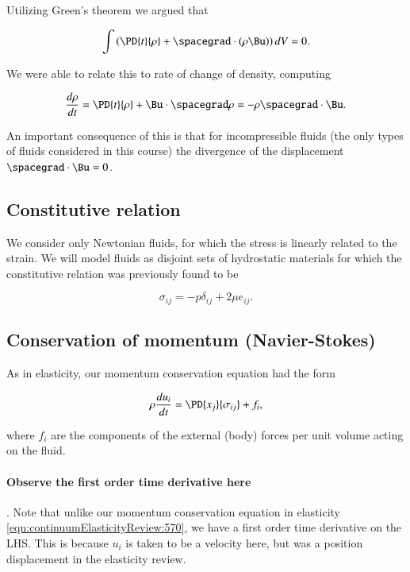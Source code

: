 Utilizing Green's theorem we argued that 

\begin{equation}\label{eqn:continuumFluidsReview:1030}
\int \left( \PD{t}{\rho} + \spacegrad \cdot (\rho \Bu) \right) dV = 0.
\end{equation}

We were able to relate this to rate of change of density, computing

\begin{equation}\label{eqn:continuumFluidsReview:1050}
\frac{d\rho}{dt} = \PD{t}{\rho} + \Bu \cdot \spacegrad \rho =
- \rho \spacegrad \cdot \Bu.
\end{equation}

An important consequence of this is that for incompressible fluids (the only types of fluids considered in this course) the divergence of the displacement $\spacegrad \cdot \Bu = 0$.

\subsection{Constitutive relation}

We consider only Newtonian fluids, for which the stress is linearly related to the strain.  We will model fluids as disjoint sets of hydrostatic materials for which the constitutive relation was previously found to be

\begin{equation}\label{eqn:continuumFluidsReview:1070}
\sigma_{ij} = - p \delta_{ij} + 2 \mu e_{ij}.
\end{equation}

\subsection{Conservation of momentum (Navier-Stokes)}

As in elasticity, our momentum conservation equation had the form

\begin{equation}\label{eqn:continuumFluidsReview:1090}
\rho \frac{du_i}{dt} = \PD{x_j}{\sigma_{ij}} + f_i,
\end{equation}

where $f_i$ are the components of the external (body) forces per unit volume acting on the fluid.

\paragraph{Observe the first order time derivative here}.  Note that unlike our momentum conservation equation in elasticity \ref{eqn:continuumElasticityReview:570}, we have a first order time derivative on the LHS.  This is because $u_i$ is taken to be a velocity here, but was a position displacement in the elasticity review.

